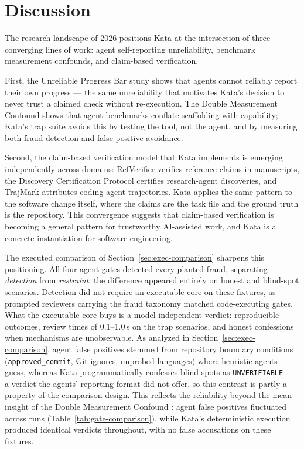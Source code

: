 \documentclass[11pt]{article}
\begin{document}
\section{Discussion}
\label{sec:discussion}

The research landscape of 2026 positions Kata at the intersection of three
converging lines of work: agent self-reporting unreliability, benchmark
measurement confounds, and claim-based verification.

First, the Unreliable Progress Bar study \cite{unreliable-progress} shows
that agents cannot reliably report their own progress --- the same
unreliability that motivates Kata's decision to never trust a claimed
check without re-execution. The Double Measurement Confound
\cite{double-measurement} shows that agent benchmarks conflate scaffolding
with capability; Kata's trap suite avoids this by testing the tool, not the
agent, and by measuring both fraud detection and false-positive avoidance.

Second, the claim-based verification model that Kata implements is
emerging independently across domains: RefVerifier \cite{refverifier}
verifies reference claims in manuscripts, the Discovery Certification
Protocol \cite{discovery-certification} certifies research-agent
discoveries, and TrajMark \cite{trajmark} attributes coding-agent
trajectories. Kata applies the same pattern to the software change itself,
where the claims are the task file and the ground truth is the repository.
This convergence suggests that claim-based verification is becoming a
general pattern for trustworthy AI-assisted work, and Kata is a concrete
instantiation for software engineering.

The executed comparison of Section~\ref{sec:exec-comparison} sharpens
this positioning. All four agent gates detected every planted fraud, separating
\emph{detection} from \emph{restraint}: the difference appeared entirely on
honest and blind-spot scenarios. Detection did not require an executable core
on these fixtures, as prompted reviewers carrying the fraud taxonomy matched
code-executing gates. What the executable core buys is a model-independent
verdict: reproducible outcomes, review times of 0.1--1.0\,s on the trap scenarios, and
honest confessions when mechanisms are unobservable. As analyzed in
Section~\ref{sec:exec-comparison}, agent false positives stemmed from
repository boundary conditions (\texttt{approved\_commit}, Git-ignores,
unprobed languages) where heuristic agents guess, whereas Kata programmatically
confesses blind spots as \texttt{UNVERIFIABLE} --- a verdict the agents'
reporting format did not offer, so this contrast is partly a property of the
comparison design. This reflects the
reliability-beyond-the-mean insight of the Double Measurement Confound
\cite{double-measurement}: agent false positives fluctuated across runs
(Table~\ref{tab:gate-comparison}), while Kata's deterministic execution
produced identical verdicts throughout, with no false accusations on these
fixtures.
\end{document}
